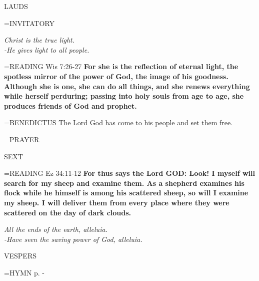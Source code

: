 \begin{flushleft}\normalsize LAUDS\\\end{flushleft}

\hangindent=\parindent \small{INVITATORY}
\begin{center}
\textit{Christ is the true light.\\}
\textit{-He gives light to all people.\\}
\end{center}

\hangindent=\parindent \small{\uppercase{READING}}    Wis 7:26-27 \textbf{   For she is the reflection of eternal light, the spotless mirror of the power of God, the image of his goodness. Although she is one, she can do all things, and she renews everything while herself perduring; passing into holy souls from age to age, she produces friends of God and prophet.\\}

\hangindent=\parindent \small{BENEDICTUS 	The Lord God has come to his people and set them free.\\}

\hangindent=\parindent \small{PRAYER 	}

\begin{flushleft}\normalsize SEXT\\\end{flushleft}

\hangindent=\parindent \small{\uppercase{READING}}    Ez 34:11-12 \textbf{   For thus says the Lord GOD: Look! I myself will search for my sheep and examine them. As a shepherd examines his flock while he himself is among his scattered sheep, so will I examine my sheep. I will deliver them from every place where they were scattered on the day of dark clouds.\\}

\begin{center}
\textit{All the ends of the earth, alleluia.\\
-Have seen the saving power of God, alleluia.}
\end{center}

\begin{flushleft}\normalsize VESPERS\\\end{flushleft}

\hangindent=\parindent \small{\uppercase{HYMN} p. \pageref{christmas:firstHymn}-\pageref{christmas:lastHymn}\\}

